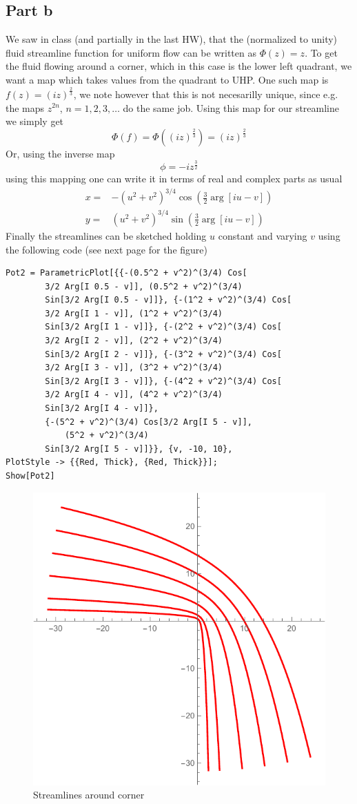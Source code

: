 \documentclass[a4paper,12pt]{article}
\begin{document}
\subsection*{Part b}
We saw in class (and partially in the last HW), that the (normalized to unity) fluid streamline function for uniform flow can be written as $\Phi(z)=z$. To get the fluid flowing around a corner, which in this case is the lower left quadrant, we want a map which takes values from the quadrant to UHP. One such map is $f(z)=(iz)^{\frac{2}{3}}$, we note however that this is not necesarilly unique, since e.g. the maps $z^{2n}$, $n=1,2,3,\dots$ do the same job.
Using this map for our streamline we simply get
\begin{equation}
\Phi(f)=\Phi((iz)^{\frac{2}{3}})=(iz)^{\frac{2}{3}}
\end{equation}
Or, using the inverse map
\begin{equation}
\phi=-iz^{\frac{3}{2}}
\end{equation}
using this mapping one can write it in terms of real and complex parts as usual
\begin{equation}
\begin{aligned}
x=&-\left(u^2+v^2\right)^{3/4} \cos \left(\frac{3}{2}  \arg[i u - v]\right)\\
y=&\left(u^2+v^2\right)^{3/4}  \sin\left(
\frac{3}{2} \arg[i u - v]
\right)
\end{aligned}
\end{equation}
Finally the streamlines can be sketched holding $u$ constant and varying $v$ using the following code (see next page for the figure)
\begin{lstlisting}
Pot2 = ParametricPlot[{{-(0.5^2 + v^2)^(3/4) Cos[
		3/2 Arg[I 0.5 - v]], (0.5^2 + v^2)^(3/4)
		Sin[3/2 Arg[I 0.5 - v]]}, {-(1^2 + v^2)^(3/4) Cos[
		3/2 Arg[I 1 - v]], (1^2 + v^2)^(3/4)
		Sin[3/2 Arg[I 1 - v]]}, {-(2^2 + v^2)^(3/4) Cos[
		3/2 Arg[I 2 - v]], (2^2 + v^2)^(3/4)
		Sin[3/2 Arg[I 2 - v]]}, {-(3^2 + v^2)^(3/4) Cos[
		3/2 Arg[I 3 - v]], (3^2 + v^2)^(3/4)
		Sin[3/2 Arg[I 3 - v]]}, {-(4^2 + v^2)^(3/4) Cos[
		3/2 Arg[I 4 - v]], (4^2 + v^2)^(3/4) 
		Sin[3/2 Arg[I 4 - v]]},
		{-(5^2 + v^2)^(3/4) Cos[3/2 Arg[I 5 - v]], 
			(5^2 + v^2)^(3/4)
		Sin[3/2 Arg[I 5 - v]]}}, {v, -10, 10}, 
PlotStyle -> {{Red, Thick}, {Red, Thick}}];
Show[Pot2]
\end{lstlisting}
\begin{figure}[H]
	\centering
	\includegraphics[width=0.6\linewidth]{contour2.pdf}
	\caption{Streamlines around corner}
	\label{fig:4}
\end{figure}
\end{document}
